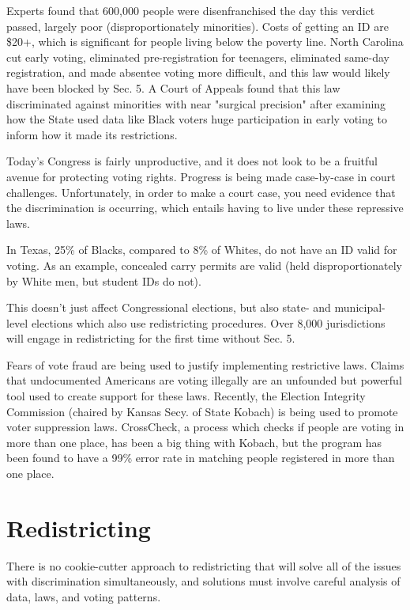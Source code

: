 Experts found that 600,000 people were disenfranchised the day this verdict passed, largely poor (disproportionately minorities).  Costs of getting an ID are \$20+, which is significant for people living below the poverty line.  North Carolina cut early voting, eliminated pre-registration for teenagers, eliminated same-day registration, and made absentee voting more difficult, and this law would likely have been blocked by Sec. 5.  A Court of Appeals found that this law discriminated against minorities with near "surgical precision" after examining how the State used data like Black voters huge participation in early voting to inform how it made its restrictions.

Today's Congress is fairly unproductive, and it does not look to be a fruitful avenue for protecting voting rights.  Progress is being made case-by-case in court challenges.  Unfortunately, in order to make a court case, you need evidence that the discrimination is occurring, which entails having to live under these repressive laws.

In Texas, 25\% of Blacks, compared to 8\% of Whites, do not have an ID valid for voting.  As an example, concealed carry permits are valid (held disproportionately by White men, but student IDs do not).

This doesn't just affect Congressional elections, but also state- and municipal-level elections which also use redistricting procedures.  Over 8,000 jurisdictions will engage in redistricting for the first time without Sec. 5.

Fears of vote fraud are being used to justify implementing restrictive laws.  Claims that undocumented Americans are voting illegally are an unfounded but powerful tool used to create support for these laws.  Recently, the Election Integrity Commission (chaired by Kansas Secy. of State Kobach) is being used to promote voter suppression laws.  CrossCheck, a process which checks if people are voting in more than one place, has been a big thing with Kobach, but the program has been found to have a 99\% error rate in matching people registered in more than one place.


\section*{Redistricting}

There is no cookie-cutter approach to redistricting that will solve all of the issues with discrimination simultaneously, and solutions must involve careful analysis of data, laws, and voting patterns.

